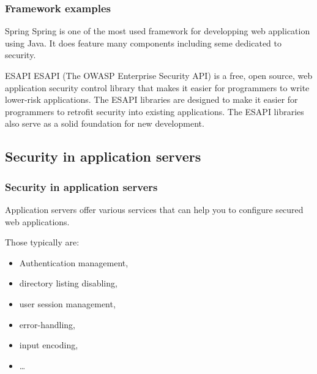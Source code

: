 \begin{frame}
\frametitle{Framework examples}

\begin{block}{Spring}
Spring is one of the most used framework for developping web
application using Java. It does feature many components including seme
dedicated to security.
\end{block}

\begin{block}{ESAPI}
ESAPI (The OWASP Enterprise Security API) is a free, open source, web
application security control library that makes it easier for
programmers to write lower-risk applications. The ESAPI libraries are
designed to make it easier for programmers to retrofit security into
existing applications. The ESAPI libraries also serve as a solid
foundation for new development.
\end{block}

\end{frame}

\subsection{Security in application servers}
\begin{frame}
\frametitle{Security in application servers}
Application servers offer various services that can help you to configure
secured web applications.

Those typically are:
\begin{itemize}
\item Authentication management,
\item directory listing disabling,
\item user session management,
\item error-handling,
\item input encoding,
\item \ldots
\end{itemize}
\end{frame}

